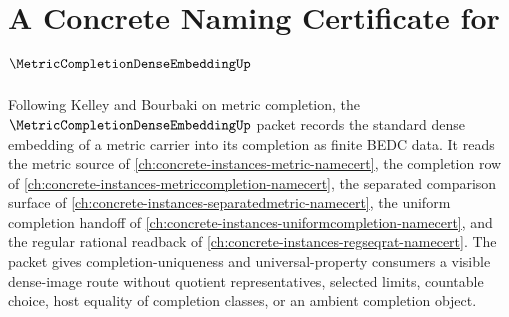 \chapter{A Concrete Naming Certificate for $\MetricCompletionDenseEmbeddingUp$}
\label{ch:concrete-instances-metric-completion-dense-embedding-namecert}

Following Kelley and Bourbaki on metric completion, the $\MetricCompletionDenseEmbeddingUp$ packet records the standard dense embedding of a metric carrier into its completion as finite BEDC data. It reads the metric source of \autoref{ch:concrete-instances-metric-namecert}, the completion row of \autoref{ch:concrete-instances-metriccompletion-namecert}, the separated comparison surface of \autoref{ch:concrete-instances-separatedmetric-namecert}, the uniform completion handoff of \autoref{ch:concrete-instances-uniformcompletion-namecert}, and the regular rational readback of \autoref{ch:concrete-instances-regseqrat-namecert}. The packet gives completion-uniqueness and universal-property consumers a visible dense-image route without quotient representatives, selected limits, countable choice, host equality of completion classes, or an ambient completion object.

